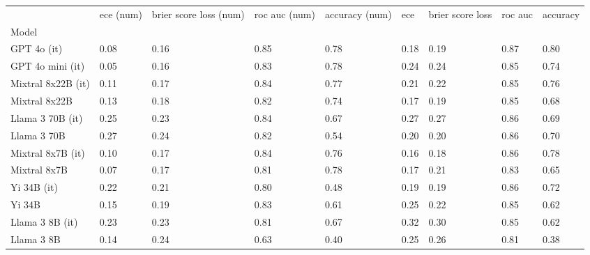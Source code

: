 \begin{tabular}{lllllllll}
\toprule
 & ece (num) & brier score loss (num) & roc auc (num) & accuracy (num) & ece & brier score loss & roc auc & accuracy \\
Model &  &  &  &  &  &  &  &  \\
\midrule
GPT 4o (it) & 0.08 & \cellcolor{cyan!25.0} 0.16 & \cellcolor{cyan!25.0} 0.85 & \cellcolor{cyan!25.0} 0.78 & \cellcolor{cyan!3.9} 0.18 & \cellcolor{cyan!20.5} 0.19 & \cellcolor{cyan!25.0} 0.87 & \cellcolor{cyan!25.0} 0.80 \\
GPT 4o mini (it) & \cellcolor{cyan!25.0} 0.05 & \cellcolor{cyan!22.6} 0.16 & \cellcolor{cyan!10.9} 0.83 & \cellcolor{cyan!22.6} 0.78 & 0.24 & 0.24 & \cellcolor{cyan!7.7} 0.85 & 0.74 \\
Mixtral 8x22B (it) & 0.11 & \cellcolor{cyan!13.2} 0.17 & \cellcolor{cyan!15.1} 0.84 & \cellcolor{cyan!17.1} 0.77 & 0.21 & \cellcolor{cyan!3.6} 0.22 & \cellcolor{cyan!1.6} 0.85 & \cellcolor{cyan!3.9} 0.76 \\
Mixtral 8x22B & 0.13 & \cellcolor{cyan!1.4} 0.18 & \cellcolor{cyan!0.4} 0.82 & \cellcolor{cyan!0.8} 0.74 & \cellcolor{cyan!13.2} 0.17 & \cellcolor{cyan!21.6} 0.19 & \cellcolor{cyan!6.7} 0.85 & 0.68 \\
Llama 3 70B (it) & 0.25 & 0.23 & \cellcolor{cyan!12.3} 0.84 & 0.67 & 0.27 & 0.27 & \cellcolor{cyan!14.8} 0.86 & 0.69 \\
Llama 3 70B & 0.27 & 0.24 & 0.82 & 0.54 & 0.20 & \cellcolor{cyan!14.9} 0.20 & \cellcolor{cyan!10.8} 0.86 & 0.70 \\
Mixtral 8x7B (it) & 0.10 & \cellcolor{cyan!13.2} 0.17 & \cellcolor{cyan!13.0} 0.84 & \cellcolor{cyan!11.1} 0.76 & \cellcolor{cyan!16.8} 0.16 & \cellcolor{cyan!25.0} 0.18 & \cellcolor{cyan!9.8} 0.86 & \cellcolor{cyan!17.4} 0.78 \\
Mixtral 8x7B & \cellcolor{cyan!4.0} 0.07 & \cellcolor{cyan!10.8} 0.17 & 0.81 & \cellcolor{cyan!23.2} 0.78 & \cellcolor{cyan!10.6} 0.17 & \cellcolor{cyan!11.5} 0.21 & 0.83 & 0.65 \\
Yi 34B (it) & 0.22 & 0.21 & 0.80 & 0.48 & \cellcolor{cyan!1.3} 0.19 & \cellcolor{cyan!18.8} 0.19 & \cellcolor{cyan!9.8} 0.86 & 0.72 \\
Yi 34B & 0.15 & 0.19 & \cellcolor{cyan!8.1} 0.83 & 0.61 & 0.25 & \cellcolor{cyan!2.5} 0.22 & \cellcolor{cyan!3.7} 0.85 & 0.62 \\
Llama 3 8B (it) & 0.23 & 0.23 & 0.81 & 0.67 & 0.32 & 0.30 & \cellcolor{cyan!3.7} 0.85 & 0.62 \\
Llama 3 8B & 0.14 & 0.24 & 0.63 & \cellcolor{orange!3.8} 0.40 & 0.25 & 0.26 & 0.81 & \cellcolor{orange!20.9} 0.38 \\

\end{tabular}
